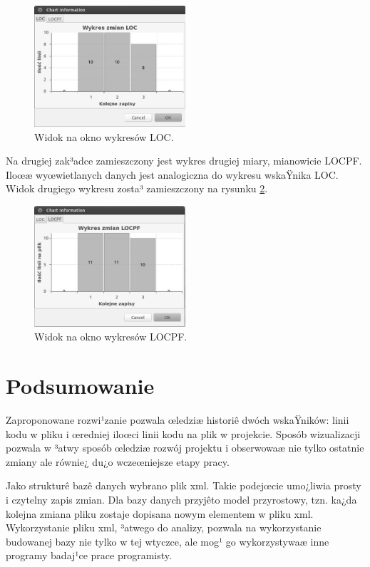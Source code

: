 		\begin{figure}[!htp]
			\centering
			\includegraphics[width=0.5\textwidth]{graphics/chartLOC.jpg}
			\caption{Widok na okno wykresów LOC.}
			\label{fig:LOC}
		\end{figure}
		
		Na drugiej zak³adce zamieszczony jest wykres drugiej miary, mianowicie LOCPF. Iloœæ wyœwietlanych
		danych jest analogiczna do wykresu wskaŸnika LOC. Widok drugiego wykresu zosta³ zamieszczony na
		rysunku \ref{fig:LOCPF}.


		\begin{figure}[!htp]
			\centering
			\includegraphics[width=0.5\textwidth]{graphics/chartLOCPF.jpg}
			\caption{Widok na okno wykresów LOCPF.}
			\label{fig:LOCPF}
		\end{figure}

\section{Podsumowanie}
\label{sec:podsumowanie}

Zaproponowane rozwi¹zanie pozwala œledziæ historiê dwóch wskaŸników: linii kodu w pliku i œredniej iloœci
linii kodu na plik w projekcie. Sposób wizualizacji pozwala w ³atwy sposób œledziæ rozwój projektu i obserwowaæ nie tylko ostatnie zmiany ale równie¿ du¿o wczeœniejsze etapy pracy.

Jako strukturê bazê danych wybrano plik xml. Takie podejœcie umo¿liwia prosty i czytelny zapis 
zmian. Dla bazy danych przyjêto model przyrostowy, tzn. ka¿da kolejna zmiana pliku zostaje 
dopisana nowym elementem w pliku xml. Wykorzystanie pliku xml, ³atwego do analizy, pozwala na 
wykorzystanie budowanej bazy nie tylko w tej wtyczce, ale mog¹ go wykorzystywaæ inne programy 
badaj¹ce prace programisty.

